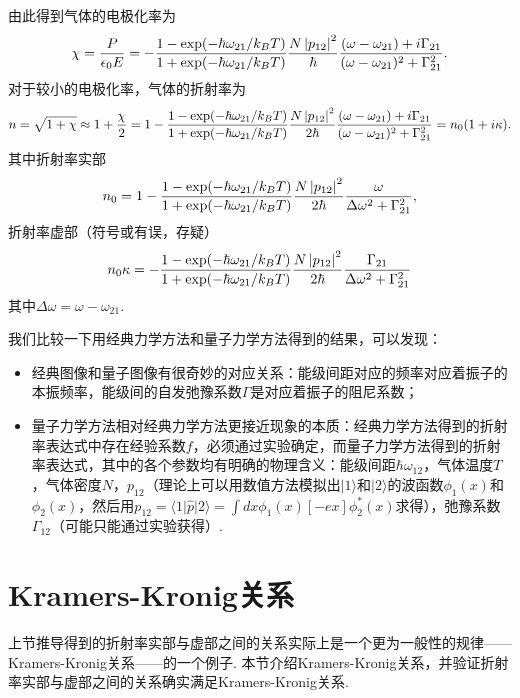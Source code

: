\documentclass{assignment}
\begin{document}
由此得到气体的电极化率为
\begin{align}
    \chi=\frac{P}{\epsilon_0E}=-\frac{1-\exp(-\hbar\omega_{21}/k_BT)}{1+\exp(-\hbar\omega_{21}/k_BT)}\frac{N\left\lvert p_{12}\right\rvert^2}{\hbar}\frac{(\omega-\omega_{21})+i\Gamma_{21}}{(\omega-\omega_{21})^2+\Gamma_{21}^2}.
\end{align}
对于较小的电极化率，气体的折射率为
\begin{align}
    n=\sqrt{1+\chi}\approx 1+\frac{\chi}{2}=1-\frac{1-\exp(-\hbar\omega_{21}/k_BT)}{1+\exp(-\hbar\omega_{21}/k_BT)}\frac{N\left\lvert p_{12}\right\rvert^2}{2\hbar}\frac{(\omega-\omega_{21})+i\Gamma_{21}}{(\omega-\omega_{21})^2+\Gamma_{21}^2}=n_0(1+i\kappa).
\end{align}
其中折射率实部
\begin{align}
    n_0=1-\frac{1-\exp(-\hbar\omega_{21}/k_BT)}{1+\exp(-\hbar\omega_{21}/k_BT)}\frac{N\left\lvert p_{12}\right\rvert^2}{2\hbar}\frac{\omega}{\Delta\omega^2+\Gamma_{21}^2},
\end{align}
折射率虚部（符号或有误，存疑）
\begin{align}
    n_0\kappa=-\frac{1-\exp(-\hbar\omega_{21}/k_BT)}{1+\exp(-\hbar\omega_{21}/k_BT)}\frac{N\left\lvert p_{12}\right\rvert^2}{2\hbar}\frac{\Gamma_{21}}{\Delta\omega^2+\Gamma_{21}^2}
\end{align}
其中$\Delta\omega=\omega-\omega_{21}$.

我们比较一下用经典力学方法和量子力学方法得到的结果，可以发现：
\begin{itemize}
    \item 经典图像和量子图像有很奇妙的对应关系：能级间距对应的频率对应着振子的本振频率，能级间的自发弛豫系数$\Gamma$是对应着振子的阻尼系数；
    \item 量子力学方法相对经典力学方法更接近现象的本质：经典力学方法得到的折射率表达式中存在经验系数$f$，必须通过实验确定，而量子力学方法得到的折射率表达式，其中的各个参数均有明确的物理含义：能级间距$\hbar\omega_{12}$，气体温度$T$，气体密度$N$，$p_{12}$（理论上可以用数值方法模拟出$\lvert 1\rangle$和$\lvert 2\rangle$的波函数$\phi_1(x)$和$\phi_2(x)$，然后用$p_{12}=\langle 1\rvert\hat{p}\lvert 2\rangle=\int dx\phi_1(x)[-ex]\phi_2^*(x)$求得），弛豫系数$\Gamma_{12}$（可能只能通过实验获得）.
\end{itemize}

\section{Kramers-Kronig关系}
上节推导得到的折射率实部与虚部之间的关系实际上是一个更为一般性的规律——Kramers-Kronig关系——的一个例子. 本节介绍Kramers-Kronig关系，并验证折射率实部与虚部之间的关系确实满足Kramers-Kronig关系.
\end{document}
